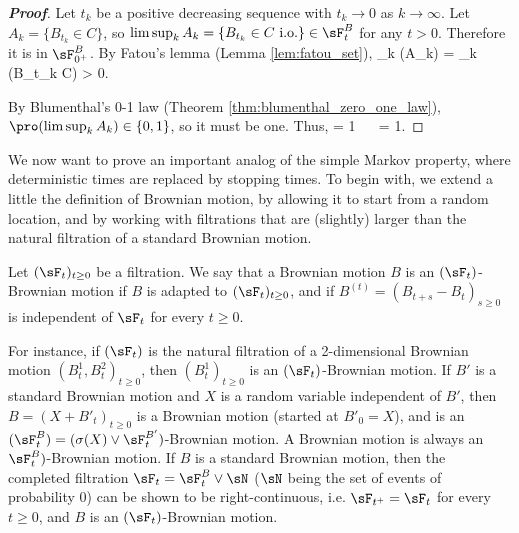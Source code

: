 \begin{proof}[\bf Proof]

Let $t_k$ be a positive decreasing sequence with $t_k \to 0$ as $k \to\infty$. Let $A_k = \{B_{t_k} \in C\}$, so $\limsup_{k} A_k = \{B_{t_k} \in C \text{ i.o.}\}\in \sF^B_t$ for any $t > 0$. Therefore it is in $\sF^B_{0^+}$. By Fatou's lemma (Lemma \ref{lem:fatou_set}),
\be
\pro{} \geq \limsup_k \pro(A_k) = \limsup_k \pro(B_{t_k} \in C) > 0.%
\ee

By Blumenthal's 0-1 law (Theorem \ref{thm:blumenthal_zero_one_law}), $\pro(\limsup_k A_k) \in \{0, 1\}$, so it must be one. Thus,
\be
\pro{} = 1 \ \ra \ \pro{} = 1.
\ee
\een
\end{proof}

We now want to prove an important analog of the simple Markov property, where deterministic times are replaced by stopping times. To begin with, we extend a little the definition of Brownian motion, by allowing it to start from a random location, and by working with filtrations that are (slightly) larger than the natural filtration of a standard Brownian motion.

\begin{definition}
Let $(\sF_t)_{t \geq 0}$ be a filtration. We say that a Brownian motion $B$ is an $(\sF_t)$-Brownian motion if $B$ is adapted to $(\sF_t)_{t \geq 0}$, and if $B^{(t)} = (B_{t+s}-B_t)_{s \geq 0}$ is independent of $\sF_t$ for every $t \geq 0$.
\end{definition}

\begin{remark}
For instance, if $(\sF_t)$ is the natural filtration of a 2-dimensional Brownian motion $(B^1_t ,B^2_t)_{t \geq 0}$, then $(B^1_t)_{t \geq 0}$ is an $(\sF_t)$-Brownian motion. If $B'$ is a standard Brownian motion and $X$ is a random variable independent of $B'$, then $B = (X + B'_t)_{t \geq 0}$ is a Brownian motion (started at $B'_0 = X$), and is an $(\sF^B_t) = (\sigma(X) \lor \sF^{B'}_t)$-Brownian motion. A Brownian motion is always an $\sF^B_t)$-Brownian motion. If $B$ is a standard Brownian motion, then the completed filtration $\sF_t = \sF^B_t \lor \sN$ ($\sN$ being the set of events of probability 0) can be shown to be right-continuous, i.e. $\sF_{t^+} = \sF_t$ for every $t \geq 0$, and $B$ is an $(\sF_t)$-Brownian motion.
\end{remark}


